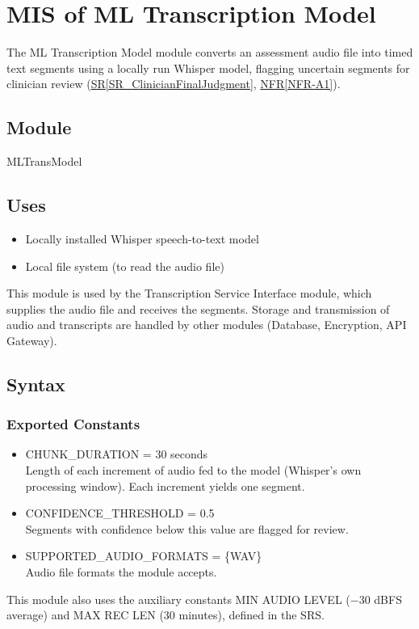 \documentclass[12pt, titlepage]{article}
\newcommand{\srsref}[2]{\href{https://github.com/Nour-Fawaz/MacaBoca/blob/main/pdfs/SRS/SRS.pdf}{#1\ref*{#2}}}
\begin{document}
\newpage

\section{MIS of ML Transcription Model} \label{MLTransModel}
The ML Transcription Model module converts an assessment audio file into timed text segments using a locally run Whisper model, flagging uncertain segments for clinician review (\srsref{SR}{SR_ClinicianFinalJudgment}, \srsref{NFR}{NFR-A1}).
\subsection{Module}
MLTransModel

\subsection{Uses}
\begin{itemize}
\item Locally installed Whisper speech-to-text model
\item Local file system (to read the audio file)
\end{itemize}
This module is used by the Transcription Service Interface module, which supplies the audio file and receives the segments. Storage and transmission of audio and transcripts are handled by other modules (Database, Encryption, API Gateway).
\subsection{Syntax}

\subsubsection{Exported Constants}
\begin{itemize}
\item CHUNK\_DURATION = 30 seconds\\
Length of each increment of audio fed to the model (Whisper's own processing window). Each increment yields one segment.
\item CONFIDENCE\_THRESHOLD = 0.5\\
Segments with confidence below this value are flagged for review.
\item SUPPORTED\_AUDIO\_FORMATS = \{WAV\}\\
Audio file formats the module accepts.
\end{itemize}
This module also uses the auxiliary constants MIN AUDIO LEVEL ($-30$ dBFS average) and MAX REC LEN (30 minutes), defined in the SRS.
\end{document}
